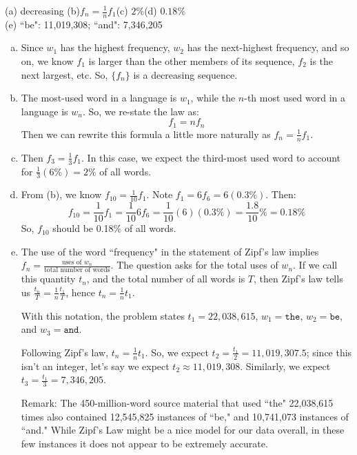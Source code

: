 \begin{answer}
	(a) decreasing \qquad(b)$f_n=\frac{1}{n}f_1$\qquad (c)  $2\%$\qquad(d) $0.18\%$\\
	(e) ``be":  11,019,308; ``and":  7,346,205%
\end{answer}
\begin{solution}
	\begin{enumerate}[(a)]
		\item Since $w_1$ has the highest frequency, $w_2$ has the next-highest frequency, and so on, we know $f_1$ is larger than the other members of its sequence, $f_2$ is the next largest, etc. So, $\{f_n\}$ is a decreasing sequence.
		\item The most-used word in a language is $w_1$, while the $n$-th most used word in a language is $w_n$. So, we re-state the law as:
		\[f_1=nf_n\] Then we can rewrite this formula a little more naturally as $f_n=\frac{1}{n}f_1$.
		\item Then $f_3=\frac{1}{3}f_1$. In this case, we expect the third-most used word to account for  $\frac{1}{3}(6\%) = 2\%$ of all words.
		\item From (b), we know $f_{10}=\frac{1}{10}f_1$. Note $f_1=6f_6=6(0.3\%)$. Then:
		\[f_{10}=\frac{1}{10}f_1 = \frac{1}{10}6f_6=\frac{1}{10}(6)(0.3\%)=\frac{1.8}{10}\%=0.18\%\]
		So, $f_{10}$ should be 0.18\% of all words.
		\item The use of the word ``frequency" in the statement of Zipf's law implies $f_n = \frac{\text{uses of $w_n$}}{\text{total number of words}}$. The question asks for the total uses of $w_n$. If we call this quantity $t_n$, and the total number of all words is $T$, then Zipf's law tells us $\frac{t_n}{T}=\frac{1}{n}\frac{t_1}{T}$, hence $t_n=\frac{1}{n}t_1$.

		With this notation, the problem states $t_1=22,038,615$, $w_1=\texttt{the}$, $w_2=\texttt{be}$, and  $w_3=\texttt{and}$.

		Following Zipf's law, $t_n=\frac1nt_1$. So, we expect $t_2=\frac{t_1}{2} = 11,019,307.5$; since this isn't an integer, let's say we expect $t_2\approx 11,019,308$. Similarly, we expect
		$t_3=\frac{t_1}{3} = 7,346,205$.

		Remark: The 450-million-word source material that used ``the" 22,038,615 times also contained 12,545,825 instances of ``be," and 10,741,073 instances of ``and." While Zipf's Law might be a nice model for our data overall, in these few instances it does not appear to be extremely accurate.


\end{enumerate}
\end{solution}
